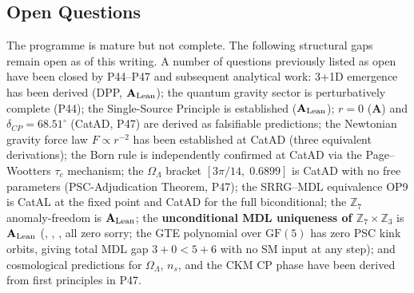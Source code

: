 \subsection{Open Questions}
\label{subsec:overview-open}

The programme is mature but not complete.  The following structural gaps remain open
as of this writing.  A number of questions previously listed as open have been closed
by P44--P47 and subsequent analytical work: 3+1D emergence has been derived (DPP, $\textbf{A}_{\rm Lean}$);
the quantum gravity sector is perturbatively complete (P44); the Single-Source Principle
is established ($\textbf{A}_{\rm Lean}$); $r = 0$ ($\mathbf{A}$) and $\delta_{CP} = 68.51^\circ$ (CatAD, P47) are derived as
falsifiable predictions; the Newtonian gravity force law $F\propto r^{-2}$ has been
established at CatAD (three equivalent derivations); the Born rule is
independently confirmed at CatAD via the Page--Wootters $\tau_c$ mechanism;
the $\Omega_\Lambda$ bracket $[3\pi/14,\;0.6899]$ is CatAD with no free parameters (PSC-Adjudication Theorem, P47);
the SRRG--MDL equivalence OP9 is CatAL at the fixed point and CatAD for the full biconditional;
the $\mathbb{Z}_7$ anomaly-freedom is $\mathbf{A}_{\rm Lean}$;
the \textbf{unconditional MDL uniqueness of $\mathbb{Z}_7\times\mathbb{Z}_3$}
is $\mathbf{A}_{\rm Lean}$ (,
, ,
all zero sorry; the GTE polynomial over $\mathrm{GF}(5)$ has zero PSC kink orbits,
giving total MDL gap $3+0 < 5+6$ with no SM input at any step);
and cosmological predictions for $\Omega_\Lambda$, $n_s$, and the CKM CP phase have
been derived from first principles in P47.

